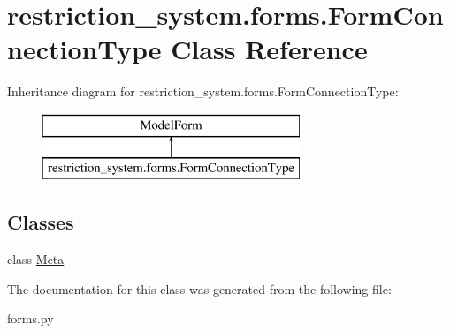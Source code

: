 \hypertarget{classrestriction__system_1_1forms_1_1FormConnectionType}{}\section{restriction\+\_\+system.\+forms.\+Form\+Connection\+Type Class Reference}
\label{classrestriction__system_1_1forms_1_1FormConnectionType}
Inheritance diagram for restriction\+\_\+system.\+forms.\+Form\+Connection\+Type\+:\begin{figure}[H]
\begin{center}
\leavevmode
\includegraphics[height=2.000000cm]{classrestriction__system_1_1forms_1_1FormConnectionType}
\end{center}
\end{figure}
\subsection*{Classes}
\begin{DoxyCompactItemize}
\item 
class \hyperlink{classrestriction__system_1_1forms_1_1FormConnectionType_1_1Meta}{Meta}
\end{DoxyCompactItemize}


The documentation for this class was generated from the following file\+:\begin{DoxyCompactItemize}
\item 
forms.\+py\end{DoxyCompactItemize}
